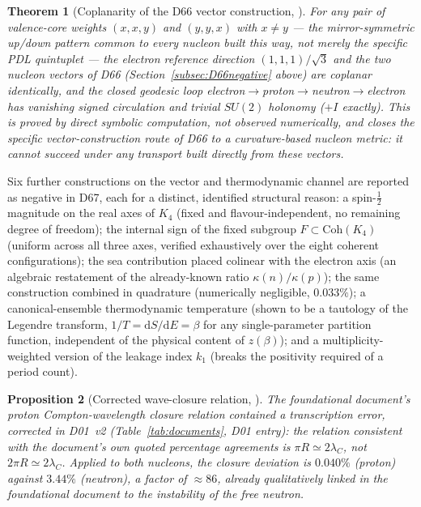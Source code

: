 \documentclass[11pt,a4paper]{article}
\theoremstyle{plain}
\newtheorem{theorem}{Theorem}[section]
\newtheorem{proposition}[theorem]{Proposition}
\theoremstyle{definition}
\theoremstyle{remark}
\begin{document}
\begin{theorem}[Coplanarity of the D66 vector construction, \cite{D67}]
\label{thm:coplanarity}
For any pair of valence-core weights $(x,x,y)$ and $(y,y,x)$ with $x\neq y$ --- the mirror-symmetric up/down pattern common to every nucleon built this way, not merely the specific PDL quintuplet --- the electron reference direction $(1,1,1)/\sqrt3$ and the two nucleon vectors of D66 (Section~\ref{subsec:D66negative} above) are coplanar identically, and the closed geodesic loop electron$\to$proton$\to$neutron$\to$electron has vanishing signed circulation and trivial $SU(2)$ holonomy ($+I$ exactly). This is proved by direct symbolic computation, not observed numerically, and closes the specific vector-construction route of D66 to a curvature-based nucleon metric: it cannot succeed under any transport built directly from these vectors.
\end{theorem}

Six further constructions on the vector and thermodynamic channel are reported as negative in D67, each for a distinct, identified structural reason: a spin-$\tfrac12$ magnitude on the real axes of $K_4$ (fixed and flavour-independent, no remaining degree of freedom); the internal sign of the fixed subgroup $F\subset\mathrm{Coh}(K_4)$ (uniform across all three axes, verified exhaustively over the eight coherent configurations); the sea contribution placed colinear with the electron axis (an algebraic restatement of the already-known ratio $\kappa(n)/\kappa(p)$); the same construction combined in quadrature (numerically negligible, $0.033\%$); a canonical-ensemble thermodynamic temperature (shown to be a tautology of the Legendre transform, $1/T=\mathrm dS/\mathrm dE=\beta$ for any single-parameter partition function, independent of the physical content of $z(\beta)$); and a multiplicity-weighted version of the leakage index $k_1$ (breaks the positivity required of a period count).

\begin{proposition}[Corrected wave-closure relation, \cite{D67}]
\label{prop:waveclosure}
The foundational document's proton Compton-wavelength closure relation contained a transcription error, corrected in D01~v2 (Table~\ref{tab:documents}, D01 entry): the relation consistent with the document's own quoted percentage agreements is $\pi R\simeq2\lambda_C$, not $2\pi R\simeq2\lambda_C$. Applied to both nucleons, the closure deviation is $0.040\%$ (proton) against $3.44\%$ (neutron), a factor of $\approx86$, already qualitatively linked in the foundational document to the instability of the free neutron.
\end{proposition}
\end{document}
